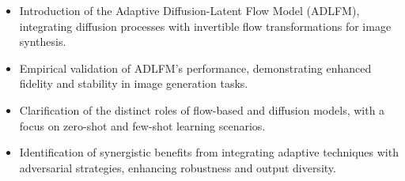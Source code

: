 \begin{itemize}
    \item Introduction of the Adaptive Diffusion-Latent Flow Model (ADLFM), integrating diffusion processes with invertible flow transformations for image synthesis.
    \item Empirical validation of ADLFM's performance, demonstrating enhanced fidelity and stability in image generation tasks.
    \item Clarification of the distinct roles of flow-based and diffusion models, with a focus on zero-shot and few-shot learning scenarios.
    \item Identification of synergistic benefits from integrating adaptive techniques with adversarial strategies, enhancing robustness and output diversity.
\end{itemize}
